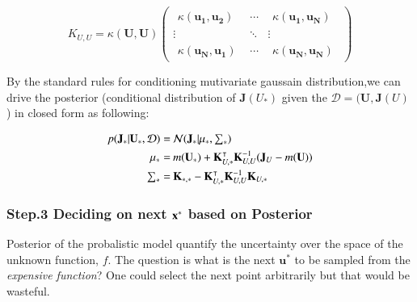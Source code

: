 \documentclass[]{elsarticle} %
\begin{document}
\[K_{U,U}=\kappa({\mathbf{U},\mathbf{U}})\left (
\begin{array}{ccc}
\begin{array}{l}
\kappa(\mathbf{u_1},\mathbf{u_2})
\end{array}
& \cdots & 
\begin{array}{l}
\kappa(\mathbf{u_1},\mathbf{u_N})
\end{array} \\
\vdots & \ddots & \vdots\\
\begin{array}{l}
\kappa(\mathbf{u_N},\mathbf{u_1})
\end{array} &
\cdots & 
\begin{array}{l}
\kappa(\mathbf{u_N},\mathbf{u_N})
\end{array} 
\end{array}
\right )\]

By the standard rules for conditioning mutivariate gaussain distribution,we can drive the posterior (conditional distribution of \(\mathbf{J}(U_*)\) given the \(\mathcal{D}=(\mathbf{U},\mathbf{J}(U)\)) in closed form as following:

\begin{align*}
  \begin{split}
p(\mathbf{J}_*|\mathbf{U_*,\mathcal{D})}= & \:  \mathcal{N}(\mathbf{J_*| \mathbf{\mu_*},\textstyle \sum_{\ast}}) \\
{\mathbf{\mu_\ast}}= & \:  m(\mathbf{U_\ast}) +\mathbf{K}^\intercal_{U,*} \mathbf{K}^{-1}_{U,U}(\mathbf{J}_U-m(\mathbf{U})) \\
\textstyle \sum_{\ast}=& \:  \normalsize{\mathbf{K}_{\ast,\ast}-\mathbf{K}^\intercal_{U,\ast}\mathbf{K}_{U,U}^{-1}\mathbf{K}_{U,\ast}}
  \end{split}
\label{eq:post_mean_cov}
\end{align*}

\hypertarget{step.3-deciding-on-next-bfxast-based-on-posterior}{%
\subsubsection{\texorpdfstring{Step.3 Deciding on next \(\bf{x}^\ast\) based on Posterior}{Step.3 Deciding on next \textbackslash bf\{x\}\^{}\textbackslash ast based on Posterior}}\label{step.3-deciding-on-next-bfxast-based-on-posterior}}

Posterior of the probalistic model quantify the uncertainty over the space of the unknown function, \(f\). The question is what is the next \(\mathbf{u}^\ast\) to be sampled from the \emph{expensive function}? One could select the next point arbitrarily but that would be wasteful.
\end{document}
